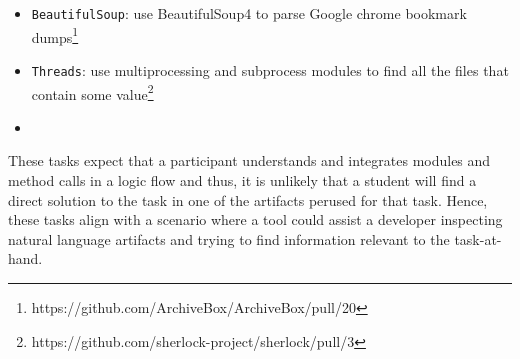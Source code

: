 \begin{itemize}
    \item \texttt{BeautifulSoup}: use BeautifulSoup4 to parse Google chrome bookmark dumps\footnote{https://github.com/ArchiveBox/ArchiveBox/pull/20}
    \item  \texttt{Threads}: use multiprocessing and subprocess modules to find all the files that contain some value\footnote{https://github.com/sherlock-project/sherlock/pull/3}
    \item {}
\end{itemize}











These tasks expect that a participant understands and integrates modules and method calls 
in a logic flow and thus, it is unlikely that a student will find a direct solution to the task in one of the artifacts perused for that task. 
Hence, these tasks align with a scenario where a tool could assist a developer inspecting natural language artifacts and trying to find information relevant to the task-at-hand. 













